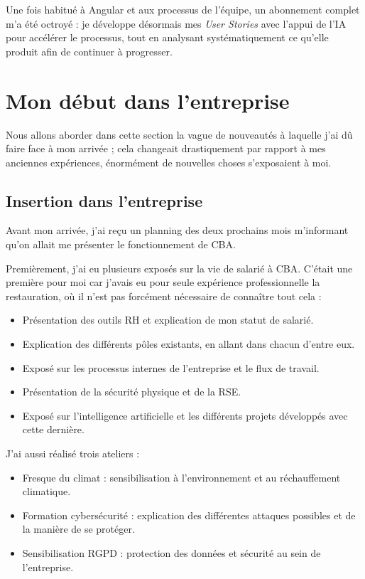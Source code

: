 \documentclass{article}
\begin{document}
Une fois habitué à Angular et aux processus de l'équipe, un abonnement complet m'a été octroyé : je développe désormais mes \textit{User Stories} avec l'appui de l'IA pour accélérer le processus, tout en analysant systématiquement ce qu'elle produit afin de continuer à progresser.

\newpage

\section{Mon début dans l'entreprise}

Nous allons aborder dans cette section la vague de nouveautés à laquelle j'ai dû faire face à mon arrivée ; cela changeait drastiquement par rapport à mes anciennes expériences, énormément de nouvelles choses s'exposaient à moi.

\subsection{Insertion dans l'entreprise}

Avant mon arrivée, j'ai reçu un planning des deux prochains mois m'informant qu'on allait me présenter le fonctionnement de CBA.

Premièrement, j'ai eu plusieurs exposés sur la vie de salarié à CBA. C'était une première pour moi car j'avais eu pour seule expérience professionnelle la restauration, où il n'est pas forcément nécessaire de connaître tout cela :

\begin{itemize}
    \item Présentation des outils RH et explication de mon statut de salarié.
    \item Explication des différents pôles existants, en allant dans chacun d'entre eux.
    \item Exposé sur les processus internes de l'entreprise et le flux de travail.
    \item Présentation de la sécurité physique et de la RSE.
    \item Exposé sur l'intelligence artificielle et les différents projets développés avec cette dernière.
\end{itemize}

J'ai aussi réalisé trois ateliers :

\begin{itemize}
    \item Fresque du climat : sensibilisation à l'environnement et au réchauffement climatique.
    \item Formation cybersécurité : explication des différentes attaques possibles et de la manière de se protéger.
    \item Sensibilisation RGPD : protection des données et sécurité au sein de l'entreprise.
\end{itemize}
\end{document}

